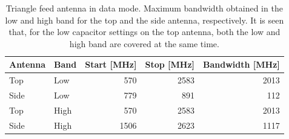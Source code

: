 \begin{table}[htbp]
    \centering
    \begin{tabular}{|l|l|r|r|r|}
        \hline
        Antenna & Band & Start [MHz] & Stop [MHz] & Bandwidth [MHz] \\
        \hline
        Top     & Low  & 570         & 2583       & 2013 \\
        Side    & Low  & 779         & 891        & 112  \\
        \hline
        Top     & High & 570         & 2583       & 2013 \\
        Side    & High & 1506        & 2623       & 1117 \\
        \hline
    \end{tabular}
    \caption{Triangle feed antenna in data mode. Maximum bandwidth obtained in the low and high band for the top and the side antenna, respectively. It is seen that, for the low capacitor settings on the top antenna, both the low and high band are covered at the same time.}
    \label{tab:bw_sol2data}
\end{table}

